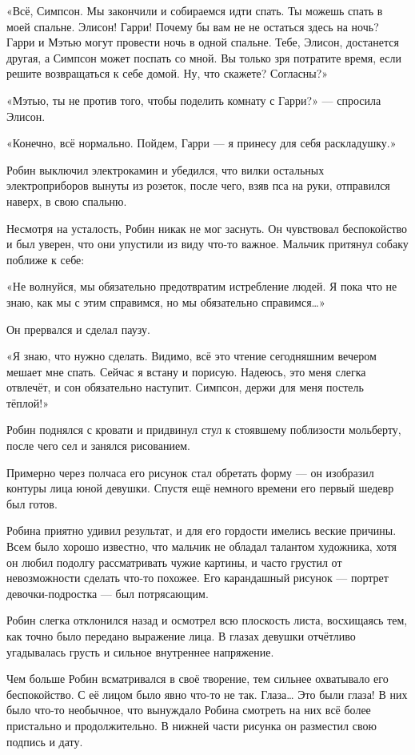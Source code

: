 \documentclass[a5paper, 9pt,
final, openany, twoside=true]{memoir}
\begin{document}
«Всё, Симпсон. Мы закончили и собираемся идти спать. Ты можешь спать в моей спальне. Элисон! Гарри! Почему бы вам не не остаться здесь на ночь? Гарри и Мэтью могут провести ночь в одной спальне. Тебе, Элисон, достанется другая, а Симпсон может поспать со мной. Вы только зря потратите время, если решите возвращаться к себе домой. Ну, что скажете? Согласны?»

«Мэтью, ты не против того, чтобы поделить комнату с Гарри?» — спросила Элисон.

«Конечно, всё нормально. Пойдем, Гарри — я принесу для себя раскладушку.»

Робин выключил электрокамин и убедился, что вилки остальных электроприборов вынуты из розеток, после чего, взяв пса на руки, отправился наверх, в свою спальню.\bigskip

Несмотря на усталость, Робин никак не мог заснуть. Он чувствовал беспокойство и был уверен, что они упустили из виду что-то важное. Мальчик притянул собаку поближе к себе:

«Не волнуйся, мы обязательно предотвратим истребление людей. Я пока что не знаю, как мы с этим справимся, но мы обязательно справимся…»

Он прервался и сделал паузу.

«Я знаю, что нужно сделать. Видимо, всё это чтение сегодняшним вечером мешает мне спать. Сейчас я встану и порисую. Надеюсь, это меня слегка отвлечёт, и сон обязательно наступит. Симпсон, держи для меня постель тёплой!»\bigskip

Робин поднялся с кровати и придвинул стул к стоявшему поблизости мольберту, после чего сел и занялся рисованием.

Примерно через полчаса его рисунок стал обретать форму — он изобразил контуры лица юной девушки. Спустя ещё немного времени его первый шедевр был готов.

Робина приятно удивил результат, и для его гордости имелись веские причины. Всем было хорошо известно, что мальчик не обладал талантом художника, хотя он любил подолгу рассматривать чужие картины, и часто грустил от невозможности сделать что-то похожее. Его карандашный рисунок — портрет девочки-подростка — был потрясающим.

Робин слегка отклонился назад и осмотрел всю плоскость листа, восхищаясь тем, как точно было передано выражение лица. В глазах девушки отчётливо угадывалась грусть и сильное внутреннее напряжение.\bigskip

Чем больше Робин всматривался в своё творение, тем сильнее охватывало его беспокойство. С её лицом было явно что-то не так. Глаза… Это были глаза! В них было что-то необычное, что вынуждало Робина смотреть на них всё более пристально и продолжительно. В нижней части рисунка он разместил свою подпись и дату.\bigskip
\end{document}
